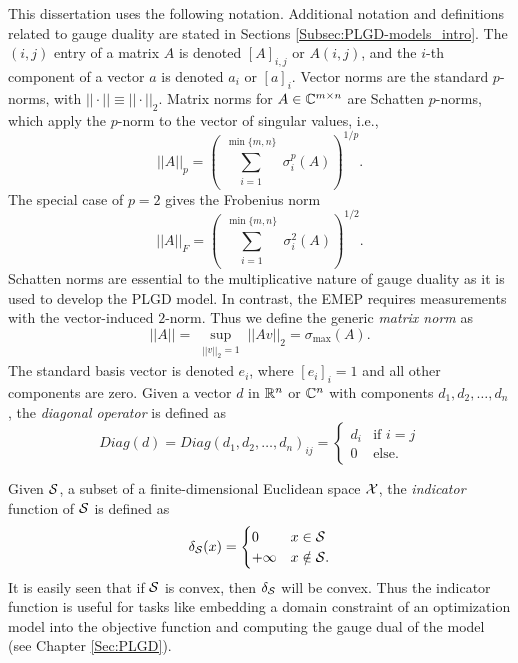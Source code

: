 This dissertation uses the following notation.  Additional notation and definitions related to gauge duality are stated in Sections \ref{Subsec:PLGD-models_intro}.  The $(i,j)$ entry of a matrix $A$ is denoted $[A]_{i,j}$ or $A(i,j)$, and the $i$-th component of a vector $a$ is denoted $a_i$ or $[a]_i$.  Vector norms are the standard $p$-norms, with $||\cdot|| \equiv || \cdot ||_2$.   Matrix norms for $A \in {\mathbb C}^{m \times n}$ are Schatten $p$-norms, which apply the  $p$-norm to the vector of singular values, i.e.,
\begin{equation}  \label{Def:shatten_norms}
||A||_p  = \left( \sum_{\substack{i = 1}}^{\substack{\min\{m, n \}}} \sigma_i^p(A) \right)^{1/p}.
\end{equation}
The special case of $p = 2$ gives the Frobenius norm
\begin{equation} 	\label{Def:Frobenius_norm}
||A||_F = \left(   \sum_{\substack{i = 1}}^{\substack{\min\{m, n \}}} \sigma_i^2(A)  \right)^{1/2}.
\end{equation}
Schatten norms are essential to the multiplicative nature of gauge duality as it is used to develop the PLGD model.  In contrast, the EMEP requires measurements with the vector-induced $2$-norm.  Thus we define the generic \textit{matrix norm} as
\begin{equation} 		\label{Def:matrix_norm}
||A|| = \sup_{\substack{||v||_2 = 1}} ||Av||_2 = \sigma_{\max}(A).
\end{equation}
The standard basis vector is denoted $e_i$, where $[e_i]_i = 1$ and all other components are zero.  
Given a vector $d$ in ${\mathbb R}^n$ or ${\mathbb C}^n$ with components $d_1, d_2, \ldots, d_n$, the \textit{diagonal operator} is defined as
\begin{equation}
Diag(d) = Diag(d_1, d_2, \ldots, d_n)_{ij} = 
	\begin{cases}
		d_i 		&		\text{if } i = j	\\
		0		&	\text{else}.
	\end{cases}
\end{equation}

Given ${\mathcal S}$, a subset of a finite-dimensional Euclidean space ${\mathcal X}$, the \textit{indicator} function of ${\mathcal S}$ is defined as
\begin{equation}  			\label{Def:indicator_function}
\delta_{\mathcal S}(x) =
	\begin{cases}
		0		&	x \in {\mathcal S}		\\
		+\infty		&	x \notin {\mathcal S}.
	\end{cases}
\end{equation}
It is easily seen that if ${\mathcal S}$ is convex, then $\delta_{\mathcal S}$ will be convex.  Thus the indicator function is useful for tasks like embedding a domain constraint of an optimization model into the objective function and computing the gauge dual of the model (see Chapter \ref{Sec:PLGD}).

